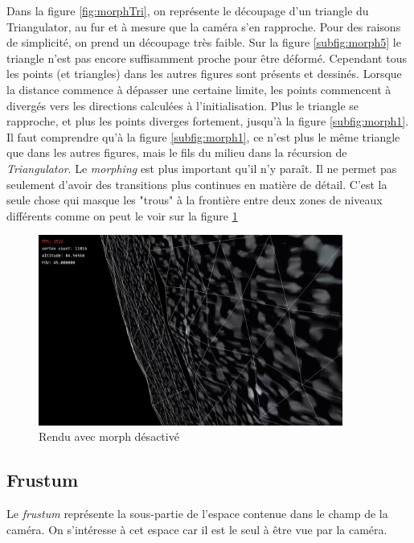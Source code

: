     Dans la figure \ref{fig:morphTri}, on représente le découpage d'un triangle du Triangulator, au fur et à mesure que la caméra s'en rapproche. Pour des raisons de simplicité, on prend un découpage très faible.
    Sur la figure \ref{subfig:morph5} le triangle n'est pas encore suffisamment proche pour être déformé. Cependant tous les points (et triangles) dans les autres figures sont présents et dessinés. 
    Lorsque la distance commence à dépasser une certaine limite, les points commencent à divergés vers les directions calculées à l'initialisation. Plus le triangle se rapproche, et plus les points diverges fortement, jusqu'à la figure \ref{subfig:morph1}. Il faut comprendre qu'à la figure \ref{subfig:morph1}, ce n'est plus le même triangle que dans les autres figures, mais le fils du milieu dans la récursion de \textit{Triangulator}.
    Le \textit{morphing} est plus important qu'il n'y paraît. Il ne permet pas seulement d'avoir des transitions plus continues en matière de détail. C'est la seule chose qui masque les "trous" à la frontière entre deux zones de niveaux différents comme on peut le voir sur la figure \ref{fig:noMorphingHole}
 \begin{figure}[H]
  \centerline{
  \includegraphics[width=10cm]{img/noMorphingHole.png}}
  \caption{Rendu avec morph désactivé}
  \label{fig:noMorphingHole}
  \end{figure}

  
  \subsection{Frustum}
  \label{sec:Frustum}
  
  
  Le \textit{frustum} représente la sous-partie de l'espace contenue dans le champ de la caméra. On s'intéresse à cet espace car il est le seul à être vue par la caméra.\\

 
